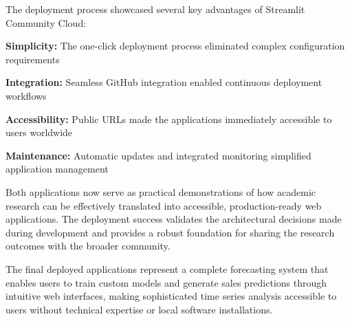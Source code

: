 The deployment process showcased several key advantages of Streamlit Community Cloud:

\textbf{Simplicity:} The one-click deployment process eliminated complex configuration requirements

\textbf{Integration:} Seamless GitHub integration enabled continuous deployment workflows

\textbf{Accessibility:} Public URLs made the applications immediately accessible to users worldwide

\textbf{Maintenance:} Automatic updates and integrated monitoring simplified application management

Both applications now serve as practical demonstrations of how academic research can be effectively translated into accessible, production-ready web applications. The deployment success validates the architectural decisions made during development and provides a robust foundation for sharing the research outcomes with the broader community.

The final deployed applications represent a complete forecasting system that enables users to train custom models and generate sales predictions through intuitive web interfaces, making sophisticated time series analysis accessible to users without technical expertise or local software installations.